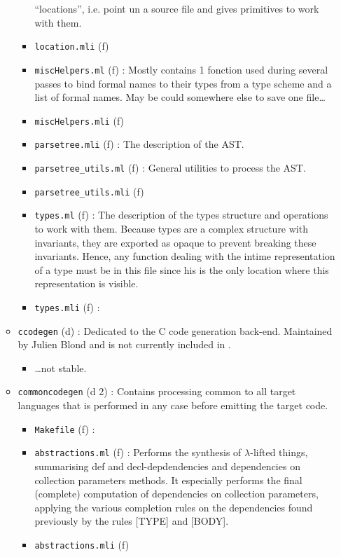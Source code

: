 \begin{itemize}
\begin{itemize}
\begin{itemize}
      ``locations'', i.e. point un a source file and gives
      primitives to work with them.
    \item {\tt location.mli} (f)
    \item {\tt miscHelpers.ml} (f) : Mostly contains 1 fonction
      used during several passes to bind formal names to their
      types from a type scheme and a list of formal names. May be
      could somewhere else to save one file\ldots
    \item {\tt miscHelpers.mli} (f)
    \item {\tt parsetree.mli} (f) : The description of the AST.
    \item {\tt parsetree\_utils.ml} (f) : General utilities to process
      the AST.
    \item {\tt parsetree\_utils.mli} (f)
    \item {\tt types.ml} (f) : The description of the types structure
      and operations to work with them. Because types are a complex
      structure with invariants, they are exported as opaque to
      prevent breaking these invariants. Hence, any function dealing
      with the intime representation of a type must be in this file
      since his is the only location where this representation is visible.
    \item {\tt types.mli} (f) :
    \end{itemize}
  \item {\tt ccodegen} (d) : Dedicated to the C code generation
    back-end. Maintained by Julien Blond and is not currently included in
    \focalize.
    \begin{itemize}
    \item \ldots not stable.
    \end{itemize}
  \item {\tt commoncodegen} (d 2) : Contains processing common to all
    target languages that is performed in any case before emitting the
    target code.
    \begin{itemize}
    \item {\tt Makefile} (f) : 
    \item {\tt abstractions.ml} (f) : Performs the synthesis of
      $\lambda$-lifted things, summarising def and decl-depdendencies
      and dependencies on collection parameters methods. It especially
      performs the final (complete) computation of dependencies on
      collection parameters, applying the various completion rules on
      the dependencies found previously by the rules [TYPE] and [BODY].
    \item {\tt abstractions.mli} (f)

\end{itemize}
\end{itemize}
\end{itemize}
